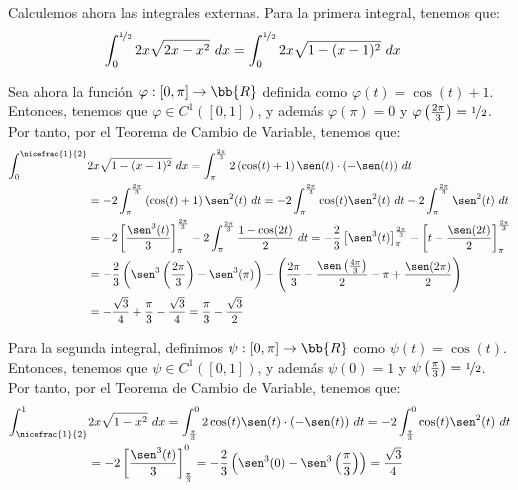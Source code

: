 \begin{ejercicio}
\begin{enumerate}
        Calculemos ahora las integrales externas. Para la primera integral, tenemos que:
        \begin{align*}
            \int_{0}^{\nicefrac{1}{2}} 2x\sqrt{2x-x^2}~dx
            &= \int_{0}^{\nicefrac{1}{2}} 2x\sqrt{1-(x-1)^2}~dx
        \end{align*}
        
        Sea ahora la función $\varphi:[0, \pi]\to\bb{R}$ definida como $\varphi(t)=\cos(t)+1$. Entonces, tenemos que $\varphi\in C^1([0,1])$,
        y además $\varphi(\pi) = 0$ y $\varphi\left(\frac{2\pi}{3}\right) = \nicefrac{1}{2}$.
        Por tanto, por el Teorema de Cambio de Variable, tenemos que:
        \begin{align*}
            \int_{0}^{\nicefrac{1}{2}} &2x\sqrt{1-(x-1)^2}~dx
            = \int_{\pi}^{\frac{2\pi}{3}} 2\left(\cos(t)+1\right)\sen(t)\cdot (-\sen(t))~dt \\
            &= -2\int_{\pi}^{\frac{2\pi}{3}} \left(\cos(t)+1\right)\sen^2(t)~dt
            = -2\int_{\pi}^{\frac{2\pi}{3}} \cos(t)\sen^2(t)~dt - 2\int_{\pi}^{\frac{2\pi}{3}} \sen^2(t)~dt \\
            &= -2\left[\dfrac{\sen^3(t)}{3}\right]_{\pi}^{\frac{2\pi}{3}} - 2\int_{\pi}^{\frac{2\pi}{3}} \dfrac{1-\cos(2t)}{2}~dt
            = -\frac{2}{3}\left[\sen^3(t)\right]_{\pi}^{\frac{2\pi}{3}} - \left[t-\dfrac{\sen(2t)}{2}\right]_{\pi}^{\frac{2\pi}{3}} \\
            &= -\frac{2}{3}\left(\sen^3\left(\frac{2\pi}{3}\right)-\sen^3(\pi)\right) - \left(\frac{2\pi}{3}-\frac{\sen\left(\frac{4\pi}{3}\right)}{2}-\pi+\frac{\sen(2\pi)}{2}\right) \\
            &= -\frac{\sqrt{3}}{4} +\frac{\pi}{3}-\frac{\sqrt{3}}{4} = \frac{\pi}{3}-\frac{\sqrt{3}}{2}
        \end{align*}

        Para la segunda integral, definimos $\psi:[0, \pi]\to\bb{R}$ como $\psi(t)=\cos(t)$. Entonces, tenemos que $\psi\in C^1([0,1])$,
        y además $\psi(0) = 1$ y $\psi\left(\frac{\pi}{3}\right) = \nicefrac{1}{2}$. Por tanto, por el Teorema de Cambio de Variable, tenemos que:
        \begin{align*}
            \int_{\nicefrac{1}{2}}^{1} &2x\sqrt{1-x^2}~dx
            = \int^{0}_{\frac{\pi}{3}} 2\cos(t)\sen(t)\cdot (-\sen(t))~dt
            = -2\int^{0}_{\frac{\pi}{3}} \cos(t)\sen^2(t)~dt \\
            &= -2 \left[\dfrac{\sen^3(t)}{3}\right]^{0}_{\frac{\pi}{3}}
            = -\frac{2}{3}\left(\sen^3(0)-\sen^3\left(\frac{\pi}{3}\right)\right) = \frac{\sqrt{3}}{4}
        \end{align*}


\end{enumerate}
\end{ejercicio}
